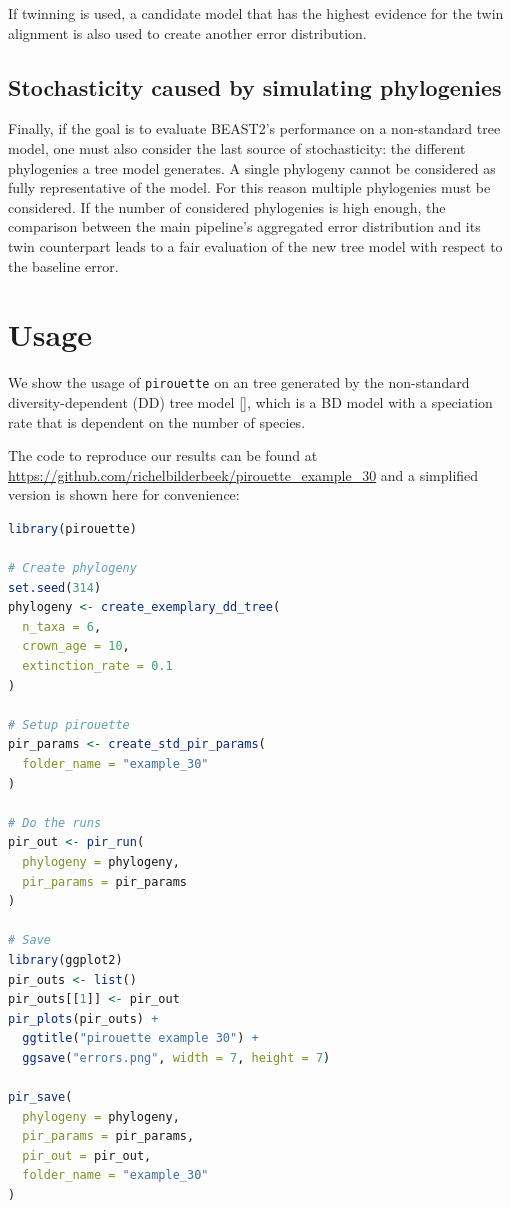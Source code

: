 If twinning is used, a candidate model that has the highest evidence for
the twin alignment is also used to create another error
distribution.

\subsection{Stochasticity caused by simulating phylogenies}

Finally, if the goal is to evaluate BEAST2's performance 
on a non-standard tree model, 
one must also consider the last source of stochasticity: 
the different phylogenies a tree model generates.
A single phylogeny cannot be considered as fully representative of the model. 
For this reason multiple phylogenies must be considered. 
If the number of considered phylogenies is high enough, 
the comparison between the main pipeline's aggregated error distribution 
and its twin counterpart leads to a fair evaluation 
of the new tree model with respect to the baseline error.

\section{Usage}

We show the usage of \verb;pirouette; on an tree generated 
by the non-standard diversity-dependent (DD) tree model [\citep{DDD, etienne2012diversity}],
which is a BD model with a speciation rate that is dependent on the number of species.

The code to reproduce our results can be found at  
\url{https://github.com/richelbilderbeek/pirouette_example_30}
and a simplified version is shown here for convenience:

\begin{lstlisting}[language=R]
library(pirouette)

# Create phylogeny
set.seed(314)
phylogeny <- create_exemplary_dd_tree(
  n_taxa = 6, 
  crown_age = 10,
  extinction_rate = 0.1
)

# Setup pirouette
pir_params <- create_std_pir_params(
  folder_name = "example_30"
)

# Do the runs
pir_out <- pir_run(
  phylogeny = phylogeny,
  pir_params = pir_params
)

# Save
library(ggplot2)
pir_outs <- list()
pir_outs[[1]] <- pir_out
pir_plots(pir_outs) +
  ggtitle("pirouette example 30") +
  ggsave("errors.png", width = 7, height = 7)

pir_save(
  phylogeny = phylogeny,
  pir_params = pir_params,
  pir_out = pir_out,
  folder_name = "example_30"
)
\end{lstlisting}

